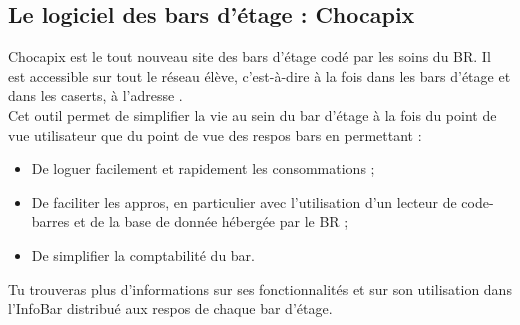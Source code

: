 \subsection{Le logiciel des bars d'étage : Chocapix}
\label{chocapix}


Chocapix est le tout nouveau site des bars d'étage codé par les soins du BR. Il est accessible sur tout le réseau élève, c'est-à-dire à la fois dans les bars d'étage et dans les caserts, à l'adresse .\\
Cet outil permet de simplifier la vie au sein du bar d'étage à la fois du point de vue utilisateur que du point de vue des respos bars en permettant :
\begin{itemize}
\item De loguer facilement et rapidement les consommations ;
\item De faciliter les appros, en particulier avec l'utilisation d'un lecteur de code-barres et de la base de donnée hébergée par le BR ;
\item De simplifier la comptabilité du bar.\\
\end{itemize}
Tu trouveras plus d'informations sur ses fonctionnalités et sur son utilisation dans l'InfoBar distribué aux respos de chaque bar d'étage.
